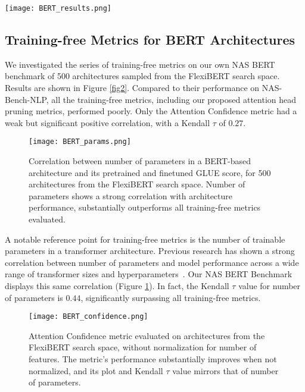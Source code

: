 \documentclass[11pt]{article}
\begin{document}
    \begin{figure*}[h!]
        \centering
        \texttt{[image: BERT\_results.png]}
        \caption{Plots of training-free metrics evaluated on 500 architectures randomly sampled from the FlexiBERT search space, against GLUE score of the pretrained and finetuned architecture. All metrics are normalized against number of features. Only our Attention Confidence metric displayed any positive correlation between the metric and final GLUE score.}
        \label{fig2}
    \end{figure*}

\subsection{Training-free Metrics for BERT Architectures}
    We investigated the series of training-free metrics on our own NAS BERT benchmark of 500 architectures sampled from the FlexiBERT search space. Results are shown in Figure \ref{fig2}. Compared to their performance on NAS-Bench-NLP, all the training-free metrics, including our proposed attention head pruning metrics, performed poorly. Only the Attention Confidence metric had a weak but significant positive correlation, with a Kendall $\tau$ of $0.27$.

    \begin{figure}[h!]
        \centering
        \texttt{[image: BERT\_params.png]}
        \caption{Correlation between number of parameters in a BERT-based architecture and its pretrained and finetuned GLUE score, for 500 architectures from the FlexiBERT search space. Number of parameters shows a strong correlation with architecture performance, substantially outperforms all training-free metrics evaluated.}
        \label{fig3}
    \end{figure}

    A notable reference point for training-free metrics is the number of trainable parameters in a transformer architecture. Previous research has shown a strong correlation between number of parameters and model performance across a wide range of transformer sizes and hyperparameters~\cite{kaplan_scaling_2020}. Our NAS BERT Benchmark displays this same correlation (Figure \ref{fig3}). In fact, the Kendall $\tau$ value for number of parameters is $0.44$, significantly surpassing all training-free metrics.

    \begin{figure}[h!]
        \centering
        \texttt{[image: BERT\_confidence.png]}
        \caption{Attention Confidence metric evaluated on architectures from the FlexiBERT search space, without normalization for number of features. The metric's performance substantially improves when not normalized, and its plot and Kendall $\tau$ value mirrors that of number of parameters.}
        \label{fig5}
    \end{figure}
\end{document}
